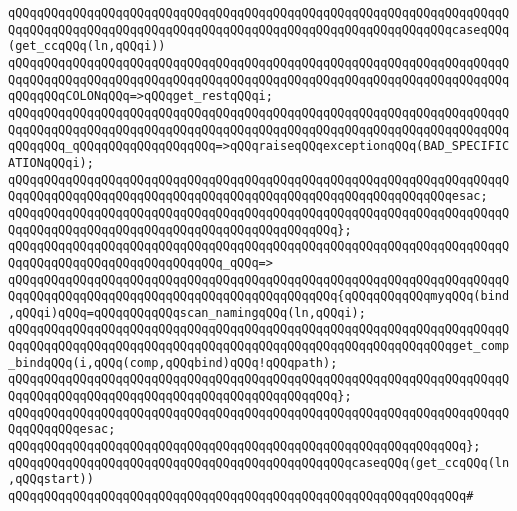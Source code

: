 \newline
\verb|qQQqqQQqqQQqqQQqqQQqqQQqqQQqqQQqqQQqqQQqqQQqqQQqqQQqqQQqqQQqqQQqqQQqqQQqqQQqqQQqqQQqqQQqqQQqqQQqqQQqqQQqqQQqqQQqqQQqqQQqqQQqqQQqqQQqcaseqQQq(get_ccqQQq(ln,qQQqi))|\newline
\verb|qQQqqQQqqQQqqQQqqQQqqQQqqQQqqQQqqQQqqQQqqQQqqQQqqQQqqQQqqQQqqQQqqQQqqQQqqQQqqQQqqQQqqQQqqQQqqQQqqQQqqQQqqQQqqQQqqQQqqQQqqQQqqQQqqQQqqQQqqQQqqQQqqQQqCOLONqQQq=>qQQqget_restqQQqi;|\newline
\verb|qQQqqQQqqQQqqQQqqQQqqQQqqQQqqQQqqQQqqQQqqQQqqQQqqQQqqQQqqQQqqQQqqQQqqQQqqQQqqQQqqQQqqQQqqQQqqQQqqQQqqQQqqQQqqQQqqQQqqQQqqQQqqQQqqQQqqQQqqQQqqQQqqQQq_qQQqqQQqqQQqqQQqqQQq=>qQQqraiseqQQqexceptionqQQq(BAD_SPECIFICATIONqQQqi);|\newline
\verb|qQQqqQQqqQQqqQQqqQQqqQQqqQQqqQQqqQQqqQQqqQQqqQQqqQQqqQQqqQQqqQQqqQQqqQQqqQQqqQQqqQQqqQQqqQQqqQQqqQQqqQQqqQQqqQQqqQQqqQQqqQQqqQQqqQQqesac;|\newline
\verb|qQQqqQQqqQQqqQQqqQQqqQQqqQQqqQQqqQQqqQQqqQQqqQQqqQQqqQQqqQQqqQQqqQQqqQQqqQQqqQQqqQQqqQQqqQQqqQQqqQQqqQQqqQQqqQQqqQQq};|\newline
\newline
\verb|qQQqqQQqqQQqqQQqqQQqqQQqqQQqqQQqqQQqqQQqqQQqqQQqqQQqqQQqqQQqqQQqqQQqqQQqqQQqqQQqqQQqqQQqqQQqqQQqqQQq_qQQq=>|\newline
\verb|qQQqqQQqqQQqqQQqqQQqqQQqqQQqqQQqqQQqqQQqqQQqqQQqqQQqqQQqqQQqqQQqqQQqqQQqqQQqqQQqqQQqqQQqqQQqqQQqqQQqqQQqqQQqqQQqqQQq{qQQqqQQqqQQqmyqQQq(bind,qQQqi)qQQq=qQQqqQQqqQQqscan_namingqQQq(ln,qQQqi);|\newline
\newline
\verb|qQQqqQQqqQQqqQQqqQQqqQQqqQQqqQQqqQQqqQQqqQQqqQQqqQQqqQQqqQQqqQQqqQQqqQQqqQQqqQQqqQQqqQQqqQQqqQQqqQQqqQQqqQQqqQQqqQQqqQQqqQQqqQQqqQQqget_comp_bindqQQq(i,qQQq(comp,qQQqbind)qQQq!qQQqpath);|\newline
\verb|qQQqqQQqqQQqqQQqqQQqqQQqqQQqqQQqqQQqqQQqqQQqqQQqqQQqqQQqqQQqqQQqqQQqqQQqqQQqqQQqqQQqqQQqqQQqqQQqqQQqqQQqqQQqqQQqqQQq};|\newline
\verb|qQQqqQQqqQQqqQQqqQQqqQQqqQQqqQQqqQQqqQQqqQQqqQQqqQQqqQQqqQQqqQQqqQQqqQQqqQQqqQQqesac;|\newline
\verb|qQQqqQQqqQQqqQQqqQQqqQQqqQQqqQQqqQQqqQQqqQQqqQQqqQQqqQQqqQQqqQQq};|\newline
\newline
\verb|qQQqqQQqqQQqqQQqqQQqqQQqqQQqqQQqqQQqqQQqqQQqqQQqcaseqQQq(get_ccqQQq(ln,qQQqstart))|\newline
\verb|qQQqqQQqqQQqqQQqqQQqqQQqqQQqqQQqqQQqqQQqqQQqqQQqqQQqqQQqqQQqqQQq#|\newline

